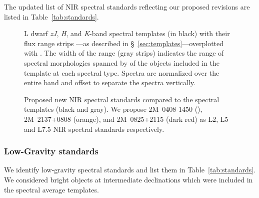 \documentclass[modern]{aastex61}
\begin{document}
The updated list of NIR spectral standards reflecting our proposed revisions are listed in Table~\ref{tab:standards}.

\begin{figure}[hb!]
        \caption{L dwarf \emph{zJ}, \emph{H}, and \emph{K}-band spectral templates (in black) with their flux range strips ---as described in \S~\ref{sec:templates}---overplotted with .
    The width of the range (gray strips) indicates the range of spectral morphologies spanned
    by of the objects included in the template at each spectral type.
    Spectra are normalized over the entire band and offset to separate the spectra vertically.}
    \label{fig:templates-stds}
\end{figure}


\begin{figure}
        \caption{Proposed new NIR spectral standards compared to the spectral templates (black and gray).
        We propose 2M~0408-1450 (), 2M~2137+0808 (orange), and 2M~0825+2115 (dark red) as L2, L5 and L7.5 NIR spectral standards respectively.}
    \label{fig:templates-newstds}
\end{figure}
\clearpage

\subsubsection{Low-Gravity standards}

We identify low-gravity spectral standards and list them in Table~\ref{tab:standards}.
We considered bright objects at intermediate declinations which were included in the spectral average templates.
\end{document}
